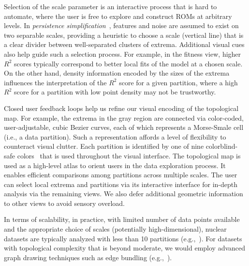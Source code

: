 Selection of the scale parameter is an interactive process that is hard to automate, where the user is free to explore and construct ROMs at arbitrary levels.
%
In \emph{persistence simplification}~\cite{Cohen-SteinerEdelsbrunnerHarer2007,EdelsbrunnerLetscherZomorodian2000}, features and noise are assumed to exist on two separable scales, providing a heuristic to choose a scale (vertical line) that is a clear divider between well-separated clusters of extrema.
%
Additional visual cues also help guide such a selection process.
%
For example, in the fitness view, higher $R^2$ scores typically correspond to better local fits of the model at a chosen scale.
%
On the other hand, density information encoded by the sizes of the extrema  influences the interpretation of the $R^2$ score for a given partition, where a high $R^2$ score for a partition with low point density may not be trustworthy.

Closed user feedback loops help us refine our visual encoding of the topological map.
%
For example, the extrema in the gray region are connected via color-coded, user-adjustable, cubic Bezier curves, each of which represents a Morse-Smale cell (i.e., a data partition).
%
Such a representation affords a level of flexibility to counteract visual clutter.
%
Each partition is identified by one of nine colorblind-safe colors~\cite{Tol2012} that is used throughout
the visual interface.
%
The topological map is used as a high-level atlas to orient users in the data exploration process.
%
It enables efficient comparisons among partitions across multiple scales.
%
The user can select local extrema and partitions via its interactive interface for in-depth analysis via the remaining views.
%
We also defer additional geometric information to other views to avoid sensory overload.

In terms of scalability, in practice, with limited number of data points available and the appropriate choice of scales (potentially high-dimensional), nuclear datasets are typically analyzed with less than 10 partitions (e.g.,~\cite{MaljovecLiuWang2015,MaljovecWangMandelli2013a,MaljovecWangPascucci2013}).
%
For datasets with topological complexity that is beyond moderate, we would employ advanced graph drawing techniques such as edge bundling (e.g.,~\cite{CuiZhouQu2008}).

